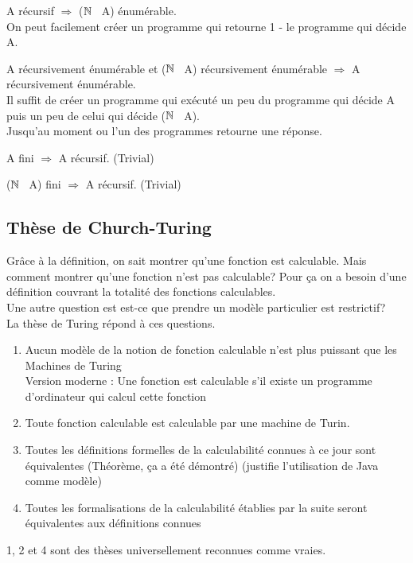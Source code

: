 \begin{myprop}
	A récursif $\Rightarrow$ ($\mathbb{N}$ \ A) énumérable.\\ On peut facilement créer
		un programme qui retourne 1 - le programme qui décide A.
\end{myprop}

\begin{myprop}
	A récursivement énumérable et ($\mathbb{N}$ \ A) récursivement énumérable 
		$\Rightarrow$ A récursivement énumérable.\\ Il suffit de créer un programme
		qui exécuté un peu du programme qui décide A puis un peu de celui qui
		décide ($\mathbb{N}$ \ A). \\Jusqu'au moment ou l'un des programmes retourne une
		réponse.
\end{myprop}

\begin{myprop}
	A fini $\Rightarrow$ A récursif. (Trivial)
\end{myprop}

\begin{myprop}
	($\mathbb{N}$ \ A) fini $\Rightarrow$ A récursif. (Trivial)
\end{myprop}



\subsection{Thèse de Church-Turing}
\label{sub:th_se_de_church_turing}
Grâce à la définition, on sait montrer qu'une fonction est calculable. Mais comment
montrer qu'une fonction n'est pas calculable? Pour ça on a besoin d'une définition
couvrant la totalité des fonctions calculables. \\
Une autre question est est-ce que prendre un modèle particulier est restrictif?\\
La thèse de Turing répond à ces questions.
\begin{enumerate}
	\item Aucun modèle de la notion de fonction calculable n'est plus puissant
		que les Machines de Turing \\
		Version moderne : Une fonction est calculable s'il existe un 
		programme d'ordinateur qui calcul cette fonction
	\item Toute fonction calculable est calculable par une machine de Turin.
	\item Toutes les définitions formelles de la calculabilité connues à ce 
		jour sont équivalentes (Théorème, ça a été démontré) (justifie 
		l'utilisation de Java comme modèle)
	\item Toutes les formalisations de la calculabilité établies par la 
		suite seront équivalentes aux définitions connues
\end{enumerate}
1, 2 et 4 sont des thèses universellement reconnues comme vraies.

